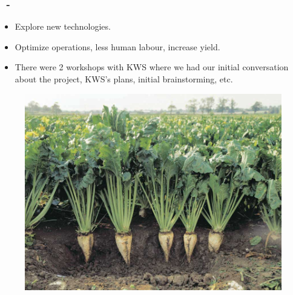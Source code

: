 \documentclass{beamer}
\begin{document}
\begin{frame}
\frametitle{\secname\ - \subsecname}
\begin{itemize}
\item Explore new technologies.
\item Optimize operations, less human labour, increase yield.
\item There were 2 workshops with KWS where we had our initial conversation about the project, KWS's plans, initial brainstorming, etc.




\end{itemize}
\begin{figure}
\includegraphics[width=0.4\linewidth]{Imagens/sugarbeet.png}
\end{figure}
\end{frame}
\end{document}
